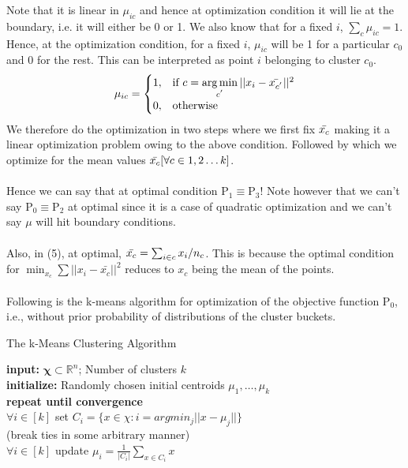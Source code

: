 \documentclass[12pt]{article}
\begin{document}
 Note that it is linear in $\mu_{ic}$ and hence at optimization condition it will lie at the boundary, i.e. it will either be 0 or 1. We also know that for a fixed $i$, $\sum_{c}{\mu_{ic}} = 1$. Hence, at the optimization condition, for a fixed $i$, $\mu_{ic}$ will be 1 for a particular $c_0$ and 0 for the rest. This can be interpreted as point $i$ belonging to cluster $c_0$.\\ 
$$
\mu_{ic}= \begin{cases}    
    1,              & \text{if } c = \mathop{\arg \min}\limits_{c^{'}} ||x_i - \Bar{x_{c^{'}}}||^2\\
    0,              & \text{otherwise}
\end{cases}$$
We therefore do the optimization in two steps where we first fix $\Bar{x_c}$ making it a linear optimization problem owing to the above condition. Followed by which we optimize for the mean values $\Bar{x_c} [\forall c \in {1,2 \dots k}]$. \\\\
Hence we can say that at optimal condition  $\text{P}_1\equiv\text{P}_3$! Note however that we can't say $\text{P}_0\equiv\text{P}_2$ at optimal since it is a case of quadratic optimization and we can't say $\mu$ will hit boundary conditions.\\\\
Also, in (5), at optimal, $\Bar{x_c} = \sum_{i \in c}x_i/n_c$. This is because the optimal condition for $\min_{x_c} \sum ||x_i - \bar{x_c}||^2$ reduces to $x_c$ being the mean of the points.\\\\
Following is the k-means algorithm for optimization of the objective function $\text{P}_0$, i.e., without prior probability of distributions of the cluster buckets. %

\begin{algorithm}[H]
\caption{The k-Means Clustering Algorithm}

\textbf{input:} $\boldsymbol{\chi} \subset \mathbb{R}^{n} $; Number of clusters $k$ \\
\textbf{initialize:} Randomly chosen initial centroids ${\mu_{1}, \dots ,\mu_{k}}$\\
\textbf{repeat until convergence}\\
\qquad $\forall i \in [k]$ set $C_i = \{x \in \chi: i = argmin_j ||{x-\mu_j}||\}$ \\
\qquad (break ties in some arbitrary manner) \\
\qquad $\forall i \in [k]$ update $\mu_i = \frac{1}{|C_i|}\sum_{x\in C_i}x$
\end{algorithm}
\end{document}

